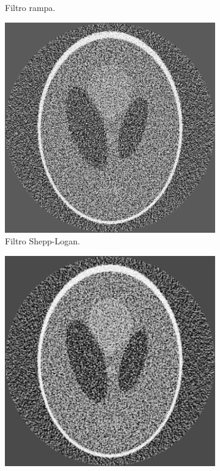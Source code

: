 \documentclass[letterpaper,12pt]{article}
\theoremstyle{plain}
\begin{document}
\begin{figure}[H]
\begin{subfigure}[h]{0.32\linewidth}
           \caption{Filtro rampa.} 
           \label{fig:noise_ramp}
        \end{subfigure}
        \begin{subfigure}[h]{0.32\linewidth}
           \centering
           \includegraphics[width=\textwidth]{Figuras/reconstruction_shepp-logan_EQ.png}
           \caption{Filtro Shepp-Logan.}
           \label{fig:noise_shepp}
        \end{subfigure}
        \begin{subfigure}[h]{0.32\linewidth}
            \centering
            \includegraphics[width=\textwidth]{Figuras/reconstruction_cosine_EQ.png}

\end{subfigure}
\end{figure}
\end{document}
